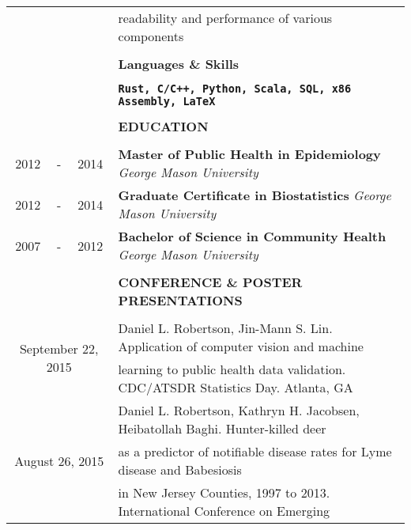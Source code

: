 \documentclass[10pt]{article}
\begin{document}
\begin{table}[ht]
\begin{tabular}{@{\hspace{0mm}}c@{\hspace{1mm}}c@{\hspace{3mm}}cl}
            & & & \hspace*{4mm}readability and performance of various components\\[-1mm]
            & & & \color{maroon}{\rule{14cm}{0.75pt}}\\
            & & & \large{\textbf{Languages \& Skills}}\\[-2mm]
            & & & \color{maroon}{\rule{14cm}{0.75pt}}\\
            \multicolumn{3}{c}{} & \textbf{\texttt{Rust, C/C++, Python, Scala, SQL, x86 Assembly, \LaTeX}}\\[-1mm]
            & & & \color{maroon}{\rule{14cm}{0.75pt}}\\
            & & & \large{\textbf{EDUCATION}}\\[-2mm]
            & & & \color{maroon}{\rule{14cm}{0.75pt}}\\
            2012 & - & 2014 & \textbf{Master of Public Health in Epidemiology} \textit{George Mason University}\\[1mm]
            2012 & - & 2014 & \textbf{Graduate Certificate in Biostatistics} \textit{George Mason University}\\[1mm]
            2007 & - & 2012 & \textbf{Bachelor of Science in Community Health} \textit{George Mason University}\\[-1mm]
            & & & \color{maroon}{\rule{14cm}{0.75pt}}\\
            & & & \large{\textbf{CONFERENCE \& POSTER PRESENTATIONS}}\\[-2mm]
            & & & \color{maroon}{\rule{14cm}{0.75pt}}\\
            \multicolumn{3}{c}{\multirow{2}{*}{September 22, 2015}} & Daniel L. Robertson, Jin-Mann S. Lin. Application of computer vision and machine\\
            & & & learning to public health data validation. CDC/ATSDR Statistics Day. Atlanta, GA\\[2mm]
            \multicolumn{3}{c}{\multirow{4}{*}{August 26, 2015}} & Daniel L. Robertson, Kathryn H. Jacobsen, Heibatollah Baghi. Hunter-killed deer\\
            & & & as a predictor of notifiable disease rates for Lyme disease and Babesiosis\\
            & & & in New Jersey Counties, 1997 to 2013. International Conference on Emerging\\

\end{tabular}
\end{table}
\end{document}
